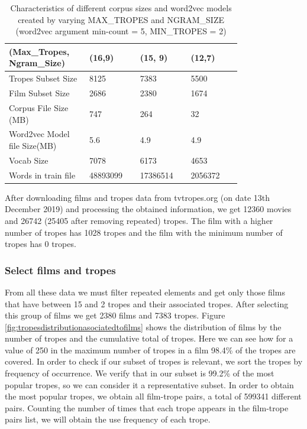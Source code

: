 \documentclass[letterpaper]{article}
\begin{document}
	\begin{table}[t]
		\centering
		\begin{tabular}{|p{0.24\linewidth}|p{0.18\linewidth}|p{0.18\linewidth}|p{0.18\linewidth}|}
			\hline
			\textbf{(Max\_Tropes, Ngram\_Size)}& \textbf{(16,9)} & \textbf{(15, 9)} & \textbf{(12,7)}\\
			\hline
			\hline
			Tropes Subset Size&8125&7383& 5500\\
			\hline
			Film Subset Size&2686&2380& 1674\\
			\hline
			Corpus File Size (MB)&747&264& 32\\
			\hline
			Word2vec Model file Size(MB)&5.6&4.9&4.9\\
			\hline
			Vocab Size& 7078 & 6173 & 4653\\
			\hline
			Words in train file& 48893099 &17386514&2056372\\
			\hline

		\end{tabular}
		\caption{Characteristics of different corpus sizes and word2vec models created by varying MAX\_TROPES and NGRAM\_SIZE (word2vec argument min-count = 5, MIN\_TROPES = 2)}
		\label{tab:corpusSize}
	\end{table}
	
After downloading films and tropes data from tvtropes.org (on date 13th December 2019) and processing the obtained information, we get 12360 movies and 26742 (25405 after removing repeated) tropes. The film with a higher number of tropes has 1028 tropes and the film with the minimum number of tropes has 0 tropes.

\subsubsection{Select films and tropes}
\label{sec:select-films}

From all these data we must filter repeated elements and get only those films that have between 15 and 2 tropes and their associated tropes. After selecting this group of films we get 2380 films and 7383 tropes.
Figure \ref{fig:tropesdistributionasociatedtofilms} shows the distribution of films by the number of tropes and the cumulative total of tropes. Here we can see how for a value of 250 in the maximum number of tropes in a film 98.4\% of the tropes are covered. In order to check if our subset of tropes is relevant, we sort the tropes by frequency of occurrence. We verify that in our subset is 99.2\% of the most popular tropes, so we can consider it a representative subset. In order to obtain the most popular tropes, we obtain all film-trope pairs, a total of 599341 different pairs. Counting the number of times that each trope appears in the film-trope pairs list, we will obtain the use frequency of each trope.
\end{document}
